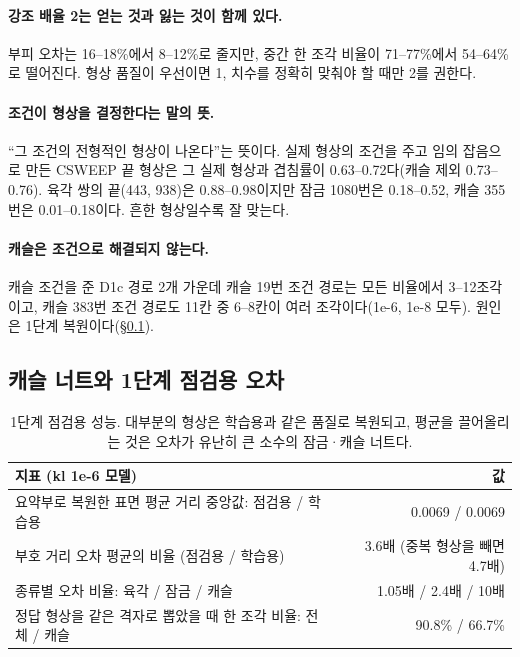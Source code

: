 \documentclass[11pt]{article}
\begin{document}
\paragraph{강조 배율 2는 얻는 것과 잃는 것이 함께 있다.} 부피 오차는 16--18\%에서 8--12\%로 줄지만, 중간 한 조각 비율이 71--77\%에서 54--64\%로
떨어진다. 형상 품질이 우선이면 1, 치수를 정확히 맞춰야 할 때만 2를 권한다.

\paragraph{조건이 형상을 결정한다는 말의 뜻.} ``그 조건의 전형적인 형상이 나온다''는 뜻이다. 실제 형상의 조건을 주고 임의 잡음으로 만든 CSWEEP 끝 형상은
그 실제 형상과 겹침률이 0.63--0.72다(캐슬 제외 0.73--0.76). 육각 쌍의 끝(443, 938)은 0.88--0.98이지만 잠금 1080번은 0.18--0.52,
캐슬 355번은 0.01--0.18이다. 흔한 형상일수록 잘 맞는다.

\paragraph{캐슬은 조건으로 해결되지 않는다.} 캐슬 조건을 준 D1c 경로 2개 가운데 캐슬 19번 조건 경로는 모든 비율에서 3--12조각이고, 캐슬 383번 조건 경로도 11칸 중 6--8칸이 여러 조각이다(1e-6, 1e-8 모두).
원인은 1단계 복원이다(\S\ref{sec:castle}).

\subsection{캐슬 너트와 1단계 점검용 오차}
\label{sec:castle}

\begin{table}[htbp]
\centering\small
\begin{tabular}{l r}
\toprule
지표 (kl 1e-6 모델) & 값 \\
\midrule
요약부로 복원한 표면 평균 거리 중앙값: 점검용 / 학습용 & 0.0069 / 0.0069 \\
부호 거리 오차 평균의 비율 (점검용 / 학습용) & 3.6배 (중복 형상을 빼면 4.7배) \\
종류별 오차 비율: 육각 / 잠금 / 캐슬 & 1.05배 / 2.4배 / 10배 \\
정답 형상을 같은 격자로 뽑았을 때 한 조각 비율: 전체 / 캐슬 & 90.8\% / 66.7\% \\
\bottomrule
\end{tabular}
\caption{1단계 점검용 성능. 대부분의 형상은 학습용과 같은 품질로 복원되고, 평균을 끌어올리는 것은 오차가 유난히 큰 소수의 잠금·캐슬 너트다.}
\label{tab:castle}
\end{table}
\end{document}
